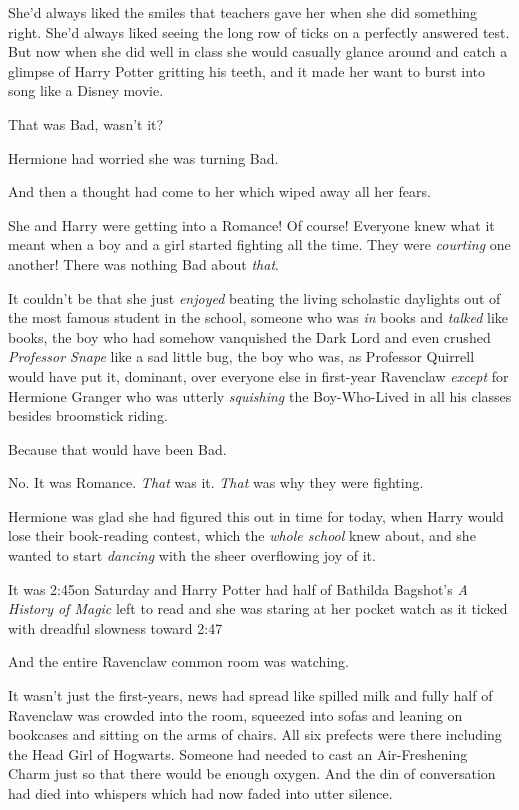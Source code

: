 She'd always liked the smiles that teachers gave her when she did something right. She'd always liked seeing the long row of ticks on a perfectly answered test. But now when she did well in class she would casually glance around and catch a glimpse of Harry Potter gritting his teeth, and it made her want to burst into song like a Disney movie.

That was Bad, wasn't it?

Hermione had worried she was turning Bad.

And then a thought had come to her which wiped away all her fears.

She and Harry were getting into a Romance! Of course! Everyone knew what it meant when a boy and a girl started fighting all the time. They were \emph{courting} one another! There was nothing Bad about \emph{that}.

It couldn't be that she just \emph{enjoyed} beating the living scholastic daylights out of the most famous student in the school, someone who was \emph{in} books and \emph{talked} like books, the boy who had somehow vanquished the Dark Lord and even crushed \emph{Professor Snape} like a sad little bug, the boy who was, as Professor Quirrell would have put it, dominant, over everyone else in first-year Ravenclaw \emph{except} for Hermione Granger who was utterly \emph{squishing} the Boy-Who-Lived in all his classes besides broomstick riding.

Because that would have been Bad.

No. It was Romance. \emph{That} was it. \emph{That} was why they were fighting.

Hermione was glad she had figured this out in time for today, when Harry would lose their book-reading contest, which the \emph{whole school} knew about, and she wanted to start \emph{dancing} with the sheer overflowing joy of it.

It was 2:45\pm on Saturday and Harry Potter had half of Bathilda Bagshot's \emph{A History of Magic} left to read and she was staring at her pocket watch as it ticked with dreadful slowness toward 2:47\pm

And the entire Ravenclaw common room was watching.

It wasn't just the first-years, news had spread like spilled milk and fully half of Ravenclaw was crowded into the room, squeezed into sofas and leaning on bookcases and sitting on the arms of chairs. All six prefects were there including the Head Girl of Hogwarts. Someone had needed to cast an Air-Freshening Charm just so that there would be enough oxygen. And the din of conversation had died into whispers which had now faded into utter silence.

